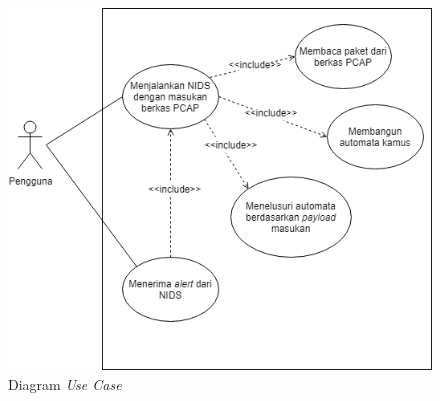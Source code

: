 \begin{figure}[htb]
  \centering
  \includegraphics[width=1.0\textwidth]{resources/use-case.png}
  \caption[Diagram \emph{Use Case}]{Diagram \emph{Use Case}}
\end{figure}